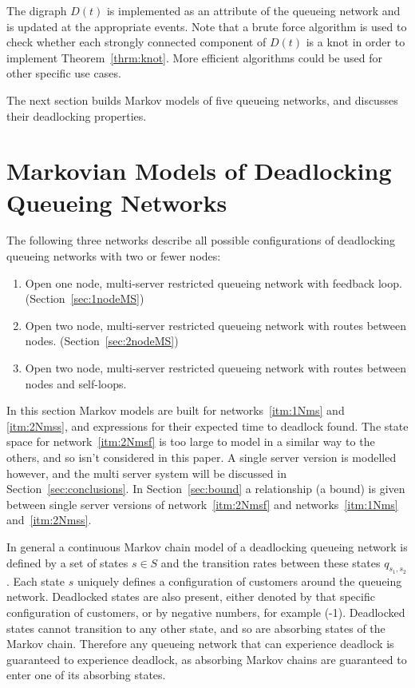 \documentclass{article}
\numberwithin{equation}{section}
\begin{document}
The digraph \(D(t)\) is implemented as an attribute of the queueing network and
is updated at the appropriate events. Note that a brute force algorithm is used
to check whether each strongly connected component of $D(t)$ is a knot in order
to implement Theorem~\ref{thrm:knot}. More efficient algorithms could be used for
other specific use cases.

The next section builds Markov models of five queueing networks, and discusses their deadlocking properties.


\section{Markovian Models of Deadlocking Queueing Networks}\label{sec:markovmodels}

The following three networks describe all possible configurations of deadlocking queueing networks with two or fewer nodes:

\begin{enumerate}
  \item Open one node, multi-server restricted queueing network with feedback loop. (Section~\ref{sec:1nodeMS}) \label{itm:1Nms}
  \item Open two node, multi-server restricted queueing network with routes between nodes. (Section~\ref{sec:2nodeMS}) \label{itm:2Nmss}
  \item Open two node, multi-server restricted queueing network with routes between nodes and self-loops. \label{itm:2Nmsf}
\end{enumerate}

In this section Markov models are built for networks~\ref{itm:1Nms} and \ref{itm:2Nmss}, and expressions for their expected time to deadlock found.
The state space for network~\ref{itm:2Nmsf} is too large to model in a similar way to the others, and so isn't considered in this paper.
A single server version is modelled however, and the multi server system will be discussed in Section~\ref{sec:conclusions}.
In Section~\ref{sec:bound} a relationship (a bound) is given between single server versions of network~\ref{itm:2Nmsf} and networks~\ref{itm:1Nms} and~\ref{itm:2Nmss}.

In general a continuous Markov chain model of a deadlocking queueing network is defined by a set of states $s \in S$ and the transition rates between these states $q_{s_1,s_2}$.
Each state $s$ uniquely defines a configuration of customers around the queueing network.
Deadlocked states are also present, either denoted by that specific configuration of customers, or by negative numbers, for example (-1).
Deadlocked states cannot transition to any other state, and so are absorbing states of the Markov chain.
Therefore any queueing network that can experience deadlock is guaranteed to experience deadlock, as absorbing Markov chains are guaranteed to enter one of its absorbing states.
\end{document}
